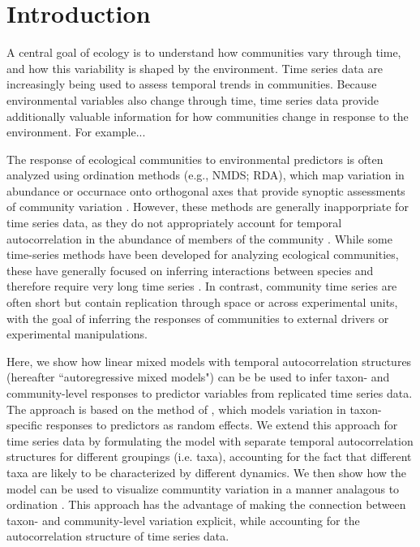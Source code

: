 \section*{Introduction}

A central goal of ecology is to understand how communities vary through time, and
how this variability is shaped by the environment.
Time series data are increasingly being used to assess temporal trends in communities.
Because environmental variables also change through time, time series data provide
additionally valuable information for how communities change in response to the
environment. For example...

The response of ecological communities to environmental predictors is often analyzed using
ordination methods (e.g., NMDS; RDA),
which map variation in abundance or occurnace onto orthogonal
axes that provide synoptic assessments of community variation \citep{Mcgarigal2013}.
However, these methods are generally inapporpriate for time series data,
as they do not appropriately account
for temporal autocorrelation in the abundance of members of the community \citep{Ives2006}.
While some time-series methods have been developed for analyzing ecological communities,
these have generally focused on inferring interactions between species and therefore
require very long time series \citep{Ives1999, Hampton2013}.
In contrast, community time series are often short but
contain replication through space or across experimental units, with the goal of inferring
the responses of communities to external drivers or experimental manipulations.

Here, we show how linear mixed models with temporal autocorrelation structures
(hereafter ``autoregressive mixed models") can be be used to infer taxon- and
community-level responses to predictor variables from replicated time series data. The
approach is based on the method of \cite{Jackson2012},
which models variation in taxon-specific responses to predictors as
random effects.
We extend this approach for time series data by formulating the model with separate
temporal autocorrelation structures for different groupings (i.e. taxa),
accounting for the fact that different taxa are likely to be characterized by
different dynamics. We then show how the model can be used to visualize
communtity variation in a manner analagous to ordination
\citep[following ][]{Jackson2012}.
This approach has the advantage of making the connection between
taxon- and community-level variation explicit, while accounting for the autocorrelation
structure of time series data.

